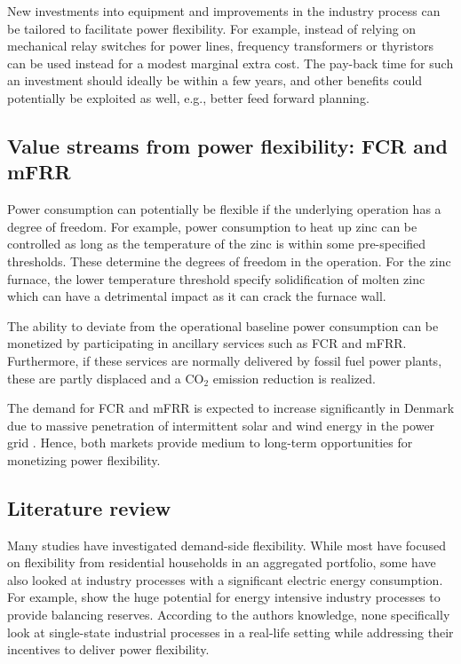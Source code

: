 \documentclass[lettersize,journal]{IEEEtran}
\begin{document}
New investments into equipment and improvements in the industry process can be tailored to facilitate power flexibility. For example, instead of relying on mechanical relay switches for power lines, frequency transformers or thyristors can be used instead for a modest marginal extra cost. The pay-back time for such an investment should ideally be within a few years, and other benefits could potentially be exploited as well, e.g., better feed forward planning.


\subsection{Value streams from power flexibility: FCR and mFRR}

Power consumption can potentially be flexible if the underlying operation has a  degree of freedom. For example, power consumption to heat up zinc can be controlled as long as the temperature of the zinc is within some pre-specified thresholds. These determine the degrees of freedom in the operation. For the zinc furnace, the lower temperature threshold specify solidification of molten zinc which can have a detrimental impact as it can crack the furnace wall.

The ability to deviate from the operational baseline power consumption can be monetized by participating in ancillary services such as FCR and mFRR. Furthermore, if these services are normally delivered by fossil fuel power plants, these are partly displaced and a CO$_{2}$ emission reduction is realized.

The demand for FCR and mFRR is expected to increase significantly in Denmark due to massive penetration of intermittent solar and wind energy in the power grid \cite{energinet:scenario_report_2022}. Hence, both markets provide medium to long-term opportunities for monetizing power flexibility.


\subsection{Literature review}

Many studies have investigated demand-side flexibility. While most have focused on flexibility from residential households in an aggregated portfolio, some have also looked at industry processes with a significant electric energy consumption. For example, \cite{paulus2011potential} show the huge potential for energy intensive industry processes to provide balancing reserves. According to the authors knowledge, none specifically look at single-state industrial processes in a real-life setting while addressing their incentives to deliver power flexibility.
\end{document}
